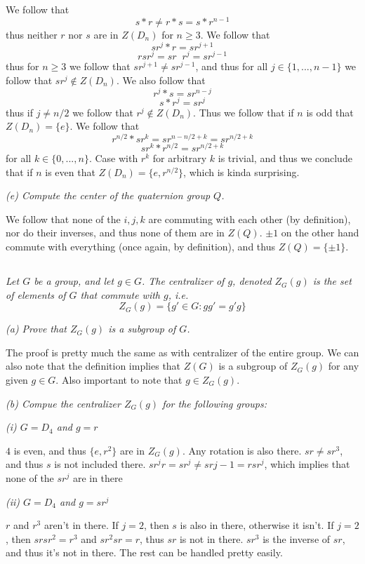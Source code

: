 \documentclass[11pt,oneside,titlepage]{book}
\DeclareMathOperator \inv {^{-1}}
\newcommand{\set}[1]{\{ #1 \}}
\begin{document}
We follow that
$$s * r \neq r * s = s * r^{n - 1}$$
thus neither $r$ nor $s$ are in $Z(D_n)$ for $n \geq 3$. We follow
that
$$sr^j * r = sr^{j + 1}$$
$$rsr^j = s r\inv r^j = sr^{j - 1}$$
thus for $n \geq 3$ we follow that $sr^{j + 1} \neq sr^{j - 1}$, and
thus for all $j \in \set{1, ..., n - 1}$ we follow that $sr^j \notin
Z(D_n)$.  We also follow that
$$r^j * s = sr^{n - j}$$
$$s * r^{j} = sr^{j}$$
thus if $j \neq n/2$ we follow that $r^j \notin Z(D_n)$. Thus we
follow that if $n$ is odd that $Z(D_n) = \set{e}$. We follow that
$$r^{n/2} * s r^k = sr^{n - n/2 + k} = sr^{n/2 + k}$$
$$s r^k * r^{n/2} = sr^{n/2 + k}$$
for all $k \in \set{0, ..., n}$. Case with $r^k$ for arbitrary $k$ is
trivial, and thus we conclude that if $n$ is even that $Z(D_n) =
\set{e, r^{n/2}}$, which is kinda surprising.

\textit{(e) Compute the center of the quaternion group $Q$.}

We follow that none of the $i, j, k$ are commuting with each other (by
definition), nor do their inverses, and thus none of them are in
$Z(Q)$. $\pm 1$ on the other hand commute with everything (once again,
by definition), and thus $Z(Q) = \set{\pm 1}$.

\subsection{}

\textit{Let $G$ be a group, and let $g \in G$. The centralizer of $g$,
denoted $Z_G(g)$ is the set of elements of $G$ that commute with $g$,
i.e.
  $$Z_G(g) = \set{g' \in G: gg' = g'g}$$
}

\textit{(a) Prove that $Z_G(g)$ is a subgroup of $G$.}

The proof is pretty much the same as with centralizer of the entire
group. We can also note that the definition implies that $Z(G)$ is a
subgroup of $Z_G(g)$ for any given $g \in G$. Also important to note
that $g \in Z_G(g)$.

\textit{(b) Compue the centralizer $Z_G(g)$ for the following groups:}

\textit{(i) $G = D_4$ and $g = r$}

$4$ is even, and thus $\set{e, r^2}$ are in $Z_G(g)$. Any rotation is
also there.  $sr \neq sr^3$, and thus $s$ is not included there. $sr^j
r = sr^j \neq sr{j - 1} = r sr^j$, which implies that none of the
$sr^j$ are in there

\textit{(ii) $G = D_4$ and $g = sr^j$}

$r$ and $r^3$ aren't in there. If $j = 2$, then $s$ is also in there,
otherwise it isn't.  If $j = 2$, then $sr sr^2 = r^{3}$ and $sr^2 sr =
r$, thus $sr$ is not in there.  $sr^3$ is the inverse of $sr$, and
thus it's not in there. The rest can be handled pretty easily.
\end{document}
